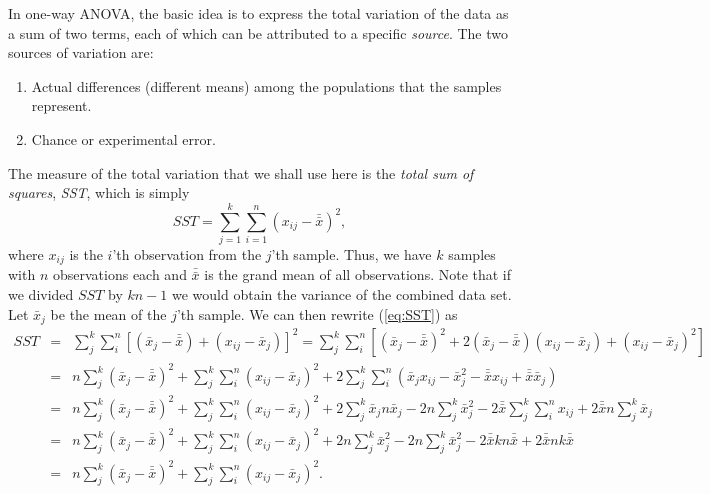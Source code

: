 	In one-way ANOVA, the basic idea is to express the total variation of the data as a 
sum of two terms, each of which can be attributed to a specific \emph{source}.  The two sources of variation are:
\begin{enumerate}
\item Actual differences (different means) among the populations that the samples represent.
\item Chance or experimental error.
\end{enumerate}
The measure of the total variation that we shall use here is the \emph{total sum of squares}, \emph{SST}, which is simply
\begin{equation}
SST = \sum ^k _{j=1} \sum ^n _{i=1} (x_{ij} - \bar{\bar{x}} ) ^2,
\label{eq:SST}
\end{equation}	 	
where $x_{ij}$ is the $i$'th observation from the $j$'th sample.  Thus, we have $k$ samples with $n$ observations 
each and $\bar{\bar{x}}$  is the grand mean of all observations.  Note that if we divided $SST$ by 
$kn-1$ we would obtain the variance 
of the combined data set.  Let $\bar{x}_j$  be the mean of the $j$'th sample.  We can then rewrite (\ref{eq:SST}) as
\begin{equation}
\begin{array}{rcl}
SST & = & \displaystyle \sum^k_j \sum^n_i [ ( \bar{x}_j - \bar{\bar{x}})   + (x_{ij} - \bar{x}_j)]^2 =  \sum^k_j \sum^n_i [(\bar{x}_{j} - \bar{\bar{x}})^2  + 2 (\bar{x}_j - \bar{\bar{x}}) (x_{ij} - \bar{x}_j) +  (x_{ij} - \bar{x}_j)^2]   \\
 & = & \displaystyle n \sum^k_j   ( \bar{x}_j - \bar{\bar{x}})^2  +  \sum^k_j \sum^n_i  (x_{ij} - \bar{x}_j)^2  +   2 \sum^k_j \sum^n_i (\bar{x}_j x_{ij} - \bar{x}^2_j - \bar{\bar{x}}x_{ij} + \bar{\bar{x}}  \bar{x}_j)   \\
 & = &   \displaystyle n \sum^k_j  ( \bar{x}_j - \bar{\bar{x}})^2 + \sum^k_j \sum^n_i  (x_{ij} - \bar{x}_j)^2 +     2  \sum^k_j  \bar{x}_j n \bar{x}_j - 2n        \sum^k_j   \bar{x}^2_j - 2\bar{\bar{x}}    \sum^k_j \sum^n_i  x_{ij} + 2 \bar{\bar{x}} n  \sum^k_j \bar{x}_j\\
& = & n \displaystyle  \sum^k_j  ( \bar{x}_j - \bar{\bar{x}})^2    + \sum^k_j \sum^n_i (x_{ij} - \bar{x}_j)^2 + 2n      \sum^k_j  \bar{x}^2_j - 2n \sum^k_j \bar{x}^2_j - 2 \bar{\bar{x}}kn \bar{\bar{x}} + 2 \bar{\bar{x}} nk \bar{\bar{x}} \\
& = &  n \displaystyle  \sum^k_j  ( \bar{x}_j - \bar{\bar{x}})^2    + \sum^k_j \sum^n_i
(x_{ij} - \bar{x}_j)^2.
\end{array}
\end{equation}	 
